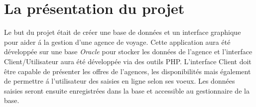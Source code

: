 \section{La pr\'esentation du projet}
Le but du projet \'etait de cr\'eer une base de donn\'ees et un interface graphique pour aider \'a la gestion d'une agence de voyage. Cette application aura \'et\'e d\'evelopp\'ee sur une base \textit{Oracle} pour stocker les donn\'ees de l'agence et l'interface Client/Utilisateur aura \'et\'e d\'evelopp\'ee via des outils PHP. L'interface Client doit \^etre capable de pr\'esenter les offres de l'agences, les disponibilit\'es mais \'egalement de permettre \'a l'utilisateur des saisies en ligne selon ses voeux. Les donn\'ees saisies seront ensuite enregistr\'ees dans la base et accessible au gestionnaire de la base.

